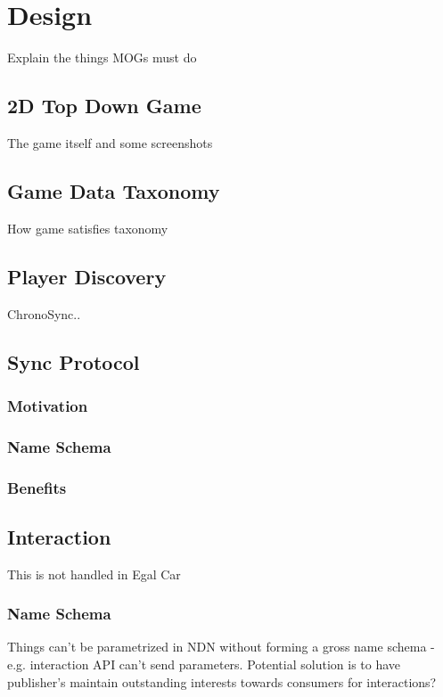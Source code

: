 \chapter{Design}
Explain the things MOGs must do 


\section{2D Top Down Game}
The game itself and some screenshots


\section{Game Data Taxonomy}
How game satisfies taxonomy


\section{Player Discovery}
ChronoSync..


\section{Sync Protocol}
\subsection{Motivation}
\subsection{Name Schema}
\subsection{Benefits}


\section{Interaction}
This is not handled in Egal Car
\subsection{Name Schema}
Things can't be parametrized in NDN without forming a gross name schema - e.g. interaction API can't send parameters. Potential solution is to have publisher's maintain outstanding interests towards consumers for interactions?



